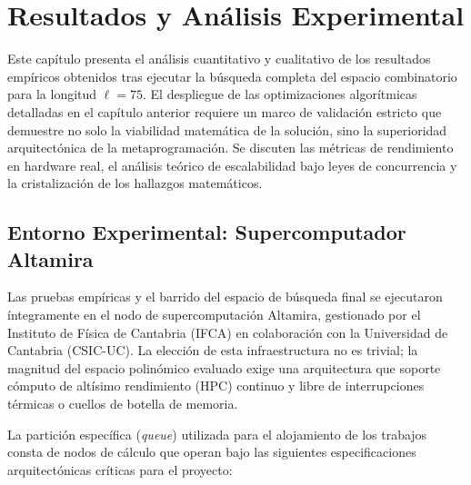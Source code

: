 \documentclass[12pt,a4paper]{tfg_domingo}
\begin{document}
\chapter{Resultados y Análisis Experimental}

Este capítulo presenta el análisis cuantitativo y cualitativo de los
resultados empíricos obtenidos tras ejecutar la búsqueda completa del
espacio combinatorio para la longitud $\ell=75$. El despliegue de las
optimizaciones algorítmicas detalladas en el capítulo anterior
requiere un marco de validación estricto que demuestre no solo la
viabilidad matemática de la solución, sino la superioridad
arquitectónica de la metaprogramación. Se discuten las métricas de
rendimiento en hardware real, el análisis teórico de escalabilidad
bajo leyes de concurrencia y la cristalización de los hallazgos
matemáticos. 

\section{Entorno Experimental: Supercomputador Altamira}

Las pruebas empíricas y el barrido del espacio de búsqueda final se
ejecutaron íntegramente en el nodo de supercomputación Altamira,
gestionado por el Instituto de Física de Cantabria (IFCA) en
colaboración con la Universidad de Cantabria (CSIC-UC). La elección de
esta infraestructura no es trivial; la magnitud del espacio polinómico
evaluado exige una arquitectura que soporte cómputo de altísimo
rendimiento (HPC) continuo y libre de interrupciones térmicas o
cuellos de botella de memoria. 

La partición específica (\emph{queue}) utilizada para el alojamiento de los trabajos consta de nodos de cálculo que operan bajo las siguientes especificaciones arquitectónicas críticas para el proyecto:
\end{document}
